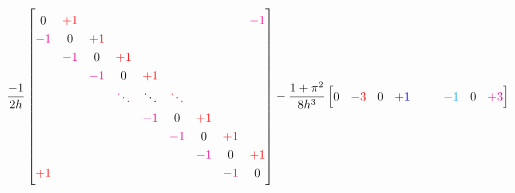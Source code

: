 \newcommand\ca{\color{red}}
\newcommand\cb{\color{magenta}}
\newcommand\cc{\color{blue}}
\newcommand\cd{\color{cyan}}
\begin{equation*}
\renewcommand{\arraystretch}{1.25} %
\renewcommand{\arraycolsep}{4.5pt} %
\frac{-1}{2 h}
\begin{bmatrix}
0           & \ca +1   &             &             &             &             &             &             & \cb -1      \\
\cb -1      & 0        & \ca +1      &             &             &             &             &             &             \\
            & \cb -1   & 0           & \ca +1      &             &             &             &             &             \\
            &          & \cb -1      & 0           & \ca +1      &             &             &             &             \\
            &          &             & \cb \ddots  & \ddots      & \ca \ddots  &             &             &             \\
            &          &             &             & \cb -1      & 0           & \ca +1      &             &             \\
            &          &             &             &             & \cb -1      & 0           & \ca +1      &             \\
            &          &             &             &             &             & \cb -1      & 0           & \ca +1      \\
\ca +1      &          &             &             &             &             &             & \cb -1      & 0           \\
\end{bmatrix}
-\frac{1+\pi^2}{8 h^3}
\begin{bmatrix}
0           & \ca -3      & 0           & \cc +1      &             &             & \cd -1      & 0           & \cb +3      \\

\end{bmatrix}
\end{equation*}
